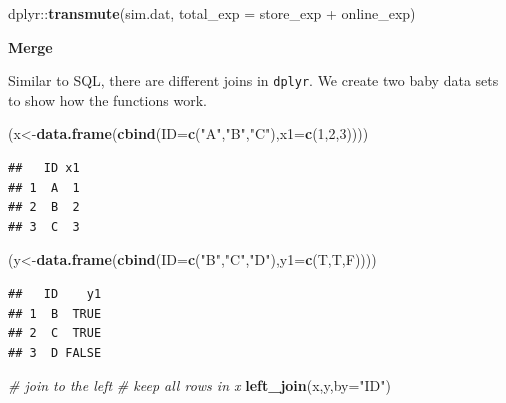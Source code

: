 \documentclass[12pt,]{krantz}
\newenvironment{Shaded}{\begin{snugshade}}{\end{snugshade}}
\newcommand{\KeywordTok}[1]{\textcolor[rgb]{0.13,0.29,0.53}{\textbf{{#1}}}}
\newcommand{\DataTypeTok}[1]{\textcolor[rgb]{0.13,0.29,0.53}{{#1}}}
\newcommand{\DecValTok}[1]{\textcolor[rgb]{0.00,0.00,0.81}{{#1}}}
\newcommand{\StringTok}[1]{\textcolor[rgb]{0.31,0.60,0.02}{{#1}}}
\newcommand{\CommentTok}[1]{\textcolor[rgb]{0.56,0.35,0.01}{\textit{{#1}}}}
\newcommand{\NormalTok}[1]{{#1}}
\theoremstyle{definition}
\theoremstyle{definition}
\theoremstyle{remark}
\begin{document}
\begin{Shaded}
\begin{Highlighting}[]
\NormalTok{dplyr::}\KeywordTok{transmute}\NormalTok{(sim.dat, }\DataTypeTok{total_exp =} \NormalTok{store_exp +}\StringTok{ }\NormalTok{online_exp) }
\end{Highlighting}
\end{Shaded}

\textbf{Merge}

Similar to SQL, there are different joins in \texttt{dplyr}. We create
two baby data sets to show how the functions work.

\begin{Shaded}
\begin{Highlighting}[]
\NormalTok{(x<-}\KeywordTok{data.frame}\NormalTok{(}\KeywordTok{cbind}\NormalTok{(}\DataTypeTok{ID=}\KeywordTok{c}\NormalTok{(}\StringTok{"A"}\NormalTok{,}\StringTok{"B"}\NormalTok{,}\StringTok{"C"}\NormalTok{),}\DataTypeTok{x1=}\KeywordTok{c}\NormalTok{(}\DecValTok{1}\NormalTok{,}\DecValTok{2}\NormalTok{,}\DecValTok{3}\NormalTok{))))}
\end{Highlighting}
\end{Shaded}

\begin{verbatim}
##   ID x1
## 1  A  1
## 2  B  2
## 3  C  3
\end{verbatim}

\begin{Shaded}
\begin{Highlighting}[]
\NormalTok{(y<-}\KeywordTok{data.frame}\NormalTok{(}\KeywordTok{cbind}\NormalTok{(}\DataTypeTok{ID=}\KeywordTok{c}\NormalTok{(}\StringTok{"B"}\NormalTok{,}\StringTok{"C"}\NormalTok{,}\StringTok{"D"}\NormalTok{),}\DataTypeTok{y1=}\KeywordTok{c}\NormalTok{(T,T,F))))}
\end{Highlighting}
\end{Shaded}

\begin{verbatim}
##   ID    y1
## 1  B  TRUE
## 2  C  TRUE
## 3  D FALSE
\end{verbatim}

\begin{Shaded}
\begin{Highlighting}[]
\CommentTok{# join to the left}
\CommentTok{# keep all rows in x}
\KeywordTok{left_join}\NormalTok{(x,y,}\DataTypeTok{by=}\StringTok{"ID"}\NormalTok{)}
\end{Highlighting}
\end{Shaded}
\end{document}
